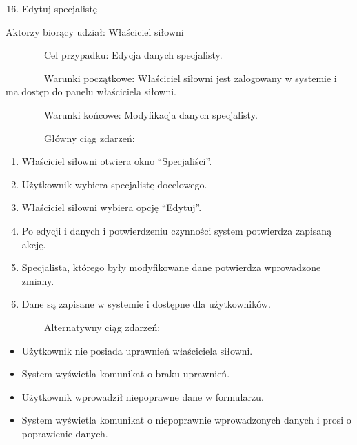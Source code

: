 \documentclass[
]{article}
\providecommand{\tightlist}{%
  \setlength{\itemsep}{0pt}\setlength{\parskip}{0pt}}
\begin{document}
\begin{enumerate}
\setcounter{enumi}{15}
\tightlist
\item
  {Edytuj specjalistę}
\end{enumerate}

{Aktorzy biorący udział: Właściciel siłowni}

{~~~~~~~~Cel przypadku: Edycja danych specjalisty.}

{~~~~~~~~Warunki początkowe: Właściciel siłowni jest zalogowany w
systemie i ma dostęp do panelu właściciela siłowni.}

{~~~~~~~~Warunki końcowe: Modyfikacja danych specjalisty.}

{~~~~~~~~Główny ciąg zdarzeń:}

\begin{enumerate}
\tightlist
\item
  {Właściciel siłowni otwiera okno ``Specjaliści''.}
\item
  {Użytkownik wybiera specjalistę docelowego.}
\item
  {Właściciel siłowni wybiera opcję ``Edytuj''.}
\item
  {Po edycji i danych i potwierdzeniu czynności system potwierdza
  zapisaną akcję.}
\item
  {Specjalista, którego były modyfikowane dane potwierdza wprowadzone
  zmiany.}
\item
  {Dane są zapisane w systemie i dostępne dla użytkowników.}
\end{enumerate}

{~~~~~~~~Alternatywny ciąg zdarzeń:}

\begin{itemize}
\tightlist
\item
  {Użytkownik nie posiada uprawnień właściciela siłowni.}
\end{itemize}

\begin{itemize}
\tightlist
\item
  {System wyświetla komunikat o braku uprawnień.}
\end{itemize}

\begin{itemize}
\tightlist
\item
  {Użytkownik wprowadził niepoprawne dane w formularzu.}
\end{itemize}

\begin{itemize}
\tightlist
\item
  {System wyświetla komunikat o niepoprawnie wprowadzonych danych i
  prosi o poprawienie danych.}
\end{itemize}
\end{document}
